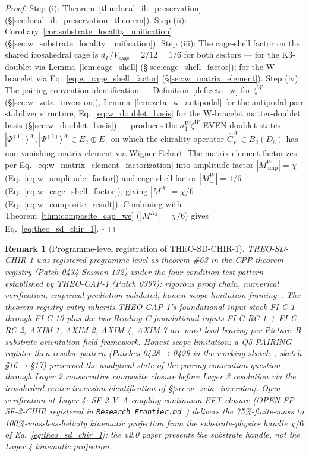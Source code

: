 \documentclass[11pt,letterpaper]{article}
\newtheorem{remark}[theorem]{Remark}
\newcommand{\Kthree}{\ensuremath{K_3}}
\newcommand{\Cchi}{\hat{C}_\chi}
\newcommand{\PsiminusOne}{|\Psi_-^{(1)}\rangle}
\newcommand{\PsiminusTwo}{|\Psi_-^{(2)}\rangle}
\newcommand{\Dsix}{D_6}
\begin{document}
\begin{proof}
Step (i): Theorem~\ref{thm:local_ih_preservation} (\S\ref{sec:local_ih_preservation_theorem}). Step (ii): Corollary~\ref{cor:substrate_locality_unification} (\S\ref{sec:w_substrate_locality_unification}). Step (iii): The cage-shell factor on the shared icosahedral cage is $d_\Gamma/V_{\text{cage}} = 2/12 = 1/6$ for both sectors --- for the K3-doublet via Lemma~\ref{lem:cage_shell} (\S\ref{sec:cage_shell_factor}); for the W-bracelet via Eq.~\eqref{eq:w_cage_shell_factor} (\S\ref{sec:w_matrix_element}). Step (iv): The pairing-convention identification --- Definition~\ref{def:zeta_w} for $\zeta^W$ (\S\ref{sec:w_zeta_inversion}), Lemma~\ref{lem:zeta_w_antipodal} for the antipodal-pair stabilizer structure, Eq.~\eqref{eq:w_doublet_basis} for the W-bracelet matter-doublet basis (\S\ref{sec:w_doublet_basis}) --- produces the $\sigma_1^W \zeta^W$-EVEN doublet states $\PsiminusOne^W, \PsiminusTwo^W \in E_2 \oplus E_1$ on which the chirality operator $\Cchi^W \in B_2(\Dsix)$ has non-vanishing matrix element via Wigner-Eckart. The matrix element factorizes per Eq.~\eqref{eq:w_matrix_element_factorization} into amplitude factor $|M_{\text{amp}}^W| = \chi$ (Eq.~\eqref{eq:w_amplitude_factor}) and cage-shell factor $|M_\perp^W| = 1/6$ (Eq.~\eqref{eq:w_cage_shell_factor}), giving $|M^W| = \chi/6$ (Eq.~\eqref{eq:w_composite_result}). Combining with Theorem~\ref{thm:composite_cap_we} ($|M^{\Kthree}| = \chi/6$) gives Eq.~\eqref{eq:theo_sd_chir_1}. $\square$
\end{proof}

\begin{remark}[Programme-level registration of THEO-SD-CHIR-1]\label{rem:theo_sd_chir_1_registration}
THEO-SD-CHIR-1 was registered programme-level as theorem \#63 in the CPP theorem-registry (Patch 0434 Session 132) under the four-condition test pattern established by THEO-CAP-1 (Patch 0397): rigorous proof chain, numerical verification, empirical prediction validated, honest scope-limitation framing~\cite{abshier_theorem_registry}. The theorem-registry entry inherits THEO-CAP-1's foundational input stack FI-C-1 through FI-C-10 plus the two Reading C foundational inputs FI-C-RC-1 + FI-C-RC-2; AXIM-1, AXIM-2, AXIM-4, AXIM-7 are most load-bearing per Picture~B substrate-orientation-field framework. Honest scope-limitation: a Q5-PAIRING register-then-resolve pattern (Patches 0428$\to$0429 in the working sketch~\cite{abshier_capotauro_chiral_mechanism_sketch}, sketch \S16$\to$\S17) preserved the analytical state of the pairing-convention question through Layer 2 conservative composite closure before Layer 3 resolution via the icosahedral-center inversion identification of \S\ref{sec:w_zeta_inversion}. Open verification at Layer 4: SF-2 V--A coupling continuum-EFT closure (OPEN-FP-SF-2-CHIR registered in \texttt{Research\_Frontier.md}~\cite{abshier_research_frontier}) delivers the 75\%-finite-mass to 100\%-massless-helicity kinematic projection from the substrate-physics handle $\chi/6$ of Eq.~\eqref{eq:theo_sd_chir_1}; the v2.0 paper presents the substrate handle, not the Layer 4 kinematic projection.
\end{remark}
\end{document}
